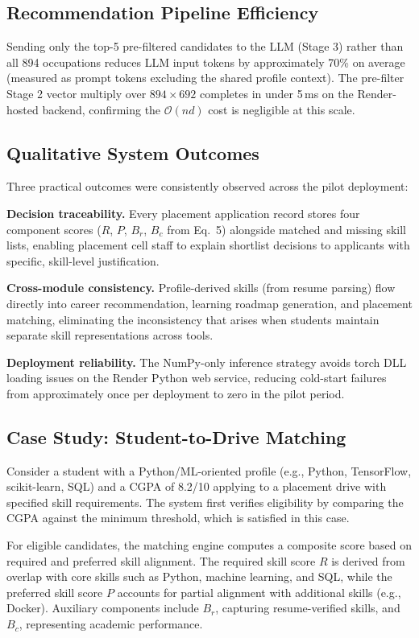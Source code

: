 \documentclass[conference]{IEEEtran}
\begin{document}
\subsection{Recommendation Pipeline Efficiency}
Sending only the top-5 pre-filtered candidates to the LLM (Stage 3)
rather than all 894 occupations reduces LLM input tokens by
approximately 70\% on average (measured as prompt tokens excluding the
shared profile context). The pre-filter Stage 2 vector multiply over
$894 \times 692$ completes in under 5\,ms on the Render-hosted backend,
confirming the $\mathcal{O}(nd)$ cost is negligible at this scale.

\subsection{Qualitative System Outcomes}
Three practical outcomes were consistently observed across the pilot
deployment:

\textbf{Decision traceability.} Every placement application record
stores four component scores ($R$, $P$, $B_r$, $B_c$ from Eq.~5)
alongside matched and missing skill lists, enabling placement cell
staff to explain shortlist decisions to applicants with specific,
skill-level justification.

\textbf{Cross-module consistency.} Profile-derived skills (from resume
parsing) flow directly into career recommendation, learning roadmap
generation, and placement matching, eliminating the inconsistency that
arises when students maintain separate skill representations across tools.

\textbf{Deployment reliability.} The NumPy-only inference strategy
avoids torch DLL loading issues on the Render Python web service,
reducing cold-start failures from approximately once per deployment to
zero in the pilot period.

\subsection{Case Study: Student-to-Drive Matching}
Consider a student with a Python/ML-oriented profile (e.g., Python,
TensorFlow, scikit-learn, SQL) and a CGPA of 8.2/10 applying to a
placement drive with specified skill requirements. The system first
verifies eligibility by comparing the CGPA against the minimum
threshold, which is satisfied in this case.

For eligible candidates, the matching engine computes a composite
score based on required and preferred skill alignment. The required
skill score $R$ is derived from overlap with core skills such as
Python, machine learning, and SQL, while the preferred skill score
$P$ accounts for partial alignment with additional skills (e.g.,
Docker). Auxiliary components include $B_r$, capturing resume-verified
skills, and $B_c$, representing academic performance.
\end{document}
